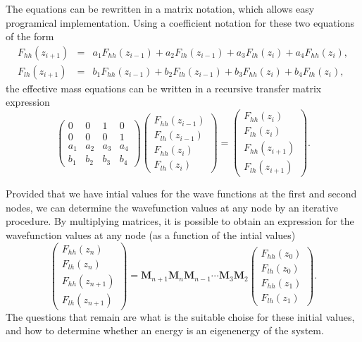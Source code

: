 The equations can be rewritten in a matrix notation, which allows
easy programical implementation. Using a coefficient notation for
these two equations of the form\begin{eqnarray}
F_{hh}(z_{i+1}) & = & a_{1}F_{hh}(z_{i-1})+a_{2}F_{lh}(z_{i-1})+a_{3}F_{lh}(z_{i})+a_{4}F_{hh}(z_{i}),\\
F_{lh}(z_{i+1}) & = & b_{1}F_{hh}(z_{i-1})+b_{2}F_{lh}(z_{i-1})+b_{3}F_{hh}(z_{i})+b_{4}F_{lh}(z_{i}),\end{eqnarray}
the effective mass equations can be written in a recursive transfer
matrix expression\begin{equation}
\left(\begin{array}{cccc}
0 & 0 & 1 & 0\\
0 & 0 & 0 & 1\\
a_{1} & a_{2} & a_{3} & a_{4}\\
b_{1} & b_{2} & b_{3} & b_{4}\end{array}\right)\left(\begin{array}{c}
F_{hh}(z_{i-1})\\
F_{lh}(z_{i-1})\\
F_{hh}(z_{i})\\
F_{lh}(z_{i})\end{array}\right)=\left(\begin{array}{c}
F_{hh}(z_{i})\\
F_{lh}(z_{i})\\
F_{hh}(z_{i+1})\\
F_{lh}(z_{i+1})\end{array}\right).\end{equation}


Provided that we have intial values for the wave functions at the
first and second nodes, we can determine the wavefunction values at
any node by an iterative procedure. By multiplying matrices, it is
possible to obtain an expression for the wavefunction values at any
node (as a function of the intial values)\begin{equation}
\left(\begin{array}{c}
F_{hh}(z_{n})\\
F_{lh}(z_{n})\\
F_{hh}(z_{n+1})\\
F_{lh}(z_{n+1})\end{array}\right)=\mathbf{M}_{n+1}\mathbf{M}_{n}\mathbf{M}_{n-1}\cdots\mathbf{M}_{3}\mathbf{M}_{2}\left(\begin{array}{c}
F_{hh}(z_{0})\\
F_{lh}(z_{0})\\
F_{hh}(z_{1})\\
F_{lh}(z_{1})\end{array}\right).\label{eq:Transfer_Matrix_Formalism}\end{equation}
The questions that remain are what is the suitable choise for these
initial values, and how to determine whether an energy is an eigenenergy
of the system.

